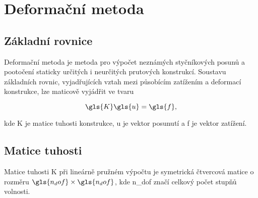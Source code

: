 \section{Deformační metoda}




\subsection{Základní rovnice}

Deformační metoda je metoda pro výpočet neznámých styčníkových posunů a pootočení staticky určitých i neurčitých prutových konstrukcí. Soustavu základních rovnic, vyjadřujících vztah mezi působícím zatížením a deformací konstrukce, lze maticově vyjádřit ve tvaru

\begin{equation}
    \label{eq:Kuf}
    \gls{K} \gls{u} = \gls{f},
\end{equation}

kde \gls{K} je matice tuhosti konstrukce, \gls{u} je vektor posunutí a \gls{f} je vektor zatížení.

\subsection{Matice tuhosti}

Matice tuhosti \gls{K} při lineárně pružném výpočtu je symetrická čtvercová matice o rozměru $\gls{n_dof} \times \gls{n_dof}$, kde \gls{n_dof} značí celkový počet stupňů volnosti. 


